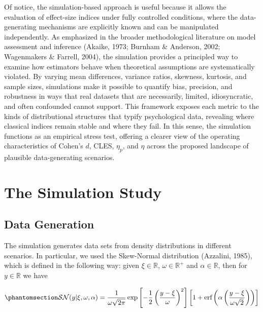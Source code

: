 \documentclass[
  12pt,
  a4paper,
  DIV=11,
  numbers=noendperiod]{scrartcl}
\begin{document}
Of notice, the simulation-based approach is useful because it allows the
evaluation of effect-size indices under fully controlled conditions,
where the data-generating mechanisms are explicitly known and can be
manipulated independently. As emphasized in the broader methodological
literature on model assessment and inference (Akaike, 1973; Burnham \&
Anderson, 2002; Wagenmakers \& Farrell, 2004), the simulation provides a
principled way to examine how estimators behave when theoretical
assumptions are systematically violated. By varying mean differences,
variance ratios, skewness, kurtosis, and sample sizes, simulations make
it possible to quantify bias, precision, and robustness in ways that
real datasets that are necessarily, limited, idiosyncratic, and often
confounded cannot support. This framework exposes each metric to the
kinds of distributional structures that typify psychological data,
revealing where classical indices remain stable and where they fail. In
this sense, the simulation functions as an empirical stress test,
offering a clearer view of the operating characteristics of Cohen's
\(d\), CLES, \(\eta_p\), and \(\eta\) across the proposed landscape of
plausible data-generating scenarios.

\section{The Simulation Study}\label{the-simulation-study}

\subsection{Data Generation}\label{data-generation}

The simulation generates data sets from density distributions in
different scenarios. In particular, we used the Skew-Normal distribution
(Azzalini, 1985), which is defined in the following way: given
\(\xi \in \mathbb{R}\), \(\omega \in \mathbb{R}^{+}\) and
\(\alpha \in \mathbb{R}\), then for \(y \in \mathbb{R}\) we have

\begin{equation}\phantomsection\label{eq-skewnormal}{
\mathcal{SN}(y|\xi, \omega, \alpha)
  = \frac{1}{\omega \sqrt{2\pi}}
    \exp\left[
       -\frac{1}{2}\left( \frac{y-\xi}{\omega} \right)^2
    \right]
    \left[
      1 + \text{erf}\left(
           \alpha \left( \frac{y-\xi}{\omega\sqrt{2}} \right)
      \right)
    \right]
}\end{equation}
\end{document}
